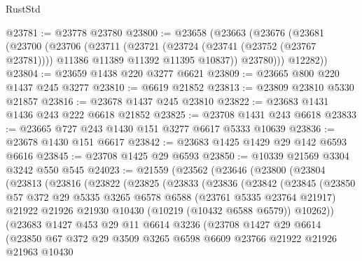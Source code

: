 \begin{lexlean}{RustStd}
\begin{coremodule}
@23781 := @23778 @23780
@23800 := @23658
    (@23663
      (@23676
        (@23681
          (@23700
            (@23706
              (@23711
                (@23721
                  (@23724 (@23741 (@23752 (@23767 @23781))))
                  @11386
                  @11389
                  @11392
                  @11395
                  @10837))
              @23780)))
        @12282))
@23804 := @23659 @1438 @220 @3277 @6621
@23809 := @23665 @800 @220 @1437 @245 @3277
@23810 := @6619 @21852
@23813 := @23809 @23810 @5330 @21857
@23816 := @23678 @1437 @245 @23810
@23822 := @23683 @1431 @1436 @243 @222 @6618 @21852
@23825 := @23708 @1431 @243 @6618
@23833 := @23665 @727 @243 @1430 @151 @3277 @6617 @5333 @10639
@23836 := @23678 @1430 @151 @6617
@23842 := @23683 @1425 @1429 @29 @142 @6593 @6616
@23845 := @23708 @1425 @29 @6593
@23850 := @10339 @21569 @3304 @3242 @550 @545
@24023 := @21559
    (@23562
      (@23646
        (@23800
          (@23804
            (@23813
              (@23816
                (@23822
                  (@23825
                    (@23833
                      (@23836
                        (@23842
                          (@23845
                            (@23850
                              @57
                              @372
                              @29
                              @5335
                              @3265
                              @6578
                              @6588
                              (@23761 @5335 @23764 @21917)
                              @21922
                              @21926
                              @21930
                              @10430
                              (@10219 (@10432 @6588 @6579))
                              @10262))
                          (@23683
                            @1427
                            @453
                            @29
                            @11
                            @6614
                            @3236
                            (@23708
                              @1427
                              @29
                              @6614
                              (@23850
                                @67
                                @372
                                @29
                                @3509
                                @3265
                                @6598
                                @6609
                                @23766
                                @21922
                                @21926
                                @21963
                                @10430

\end{coremodule}
\end{lexlean}
